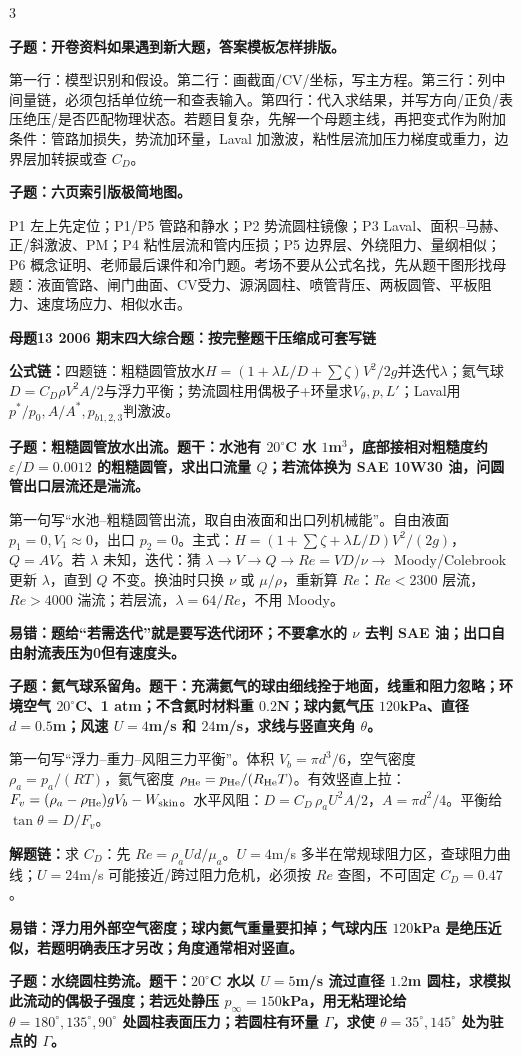 \documentclass[a4paper]{article}
\newcommand{\mt}[1]{\vspace{0.22pt}\colorbox{M}{\parbox{\dimexpr\linewidth-2\fboxsep}{\color{white}\bfseries #1}}\par}
\newcommand{\qt}[1]{\vspace{0.10pt}\colorbox{Q}{\parbox{\dimexpr\linewidth-2\fboxsep}{\color{white}\bfseries #1}}\par}
\newcommand{\ans}[1]{\colorbox{G}{\parbox{\dimexpr\linewidth-2\fboxsep}{#1}}\par}
\newcommand{\warn}[1]{\colorbox{Y}{\parbox{\dimexpr\linewidth-2\fboxsep}{\color{E}\bfseries #1}}\par}
\newcommand{\chain}[1]{{\color{A}\bfseries 解题链：}#1\par}
\newcommand{\form}[1]{{\color{M}\bfseries 公式链：}#1\par}
\begin{document}
\begin{multicols}{3}
\qt{子题：开卷资料如果遇到新大题，答案模板怎样排版。}
\ans{第一行：模型识别和假设。第二行：画截面/CV/坐标，写主方程。第三行：列中间量链，必须包括单位统一和查表输入。第四行：代入求结果，并写方向/正负/表压绝压/是否匹配物理状态。若题目复杂，先解一个母题主线，再把变式作为附加条件：管路加损失，势流加环量，Laval 加激波，粘性层流加压力梯度或重力，边界层加转捩或查 $C_D$。}
\qt{子题：六页索引版极简地图。}
\ans{P1 左上先定位；P1/P5 管路和静水；P2 势流圆柱镜像；P3 Laval、面积--马赫、正/斜激波、PM；P4 粘性层流和管内压损；P5 边界层、外绕阻力、量纲相似；P6 概念证明、老师最后课件和冷门题。考场不要从公式名找，先从题干图形找母题：液面管路、闸门曲面、CV受力、源涡圆柱、喷管背压、两板圆管、平板阻力、速度场应力、相似水击。}

\mt{母题13 2006 期末四大综合题：按完整题干压缩成可套写链}
\form{四题链：粗糙圆管放水$H=(1+\lambda L/D+\sum\zeta)V^2/2g$并迭代$\lambda$；氦气球$D=C_D\rho V^2A/2$与浮力平衡；势流圆柱用偶极子+环量求$V_\theta,p,L'$；Laval用$p^*/p_0,A/A^*,p_{b1,2,3}$判激波。}
\qt{子题：粗糙圆管放水出流。题干：水池有 $20^\circ$C 水 $1$m$^3$，底部接相对粗糙度约 $\varepsilon/D=0.0012$ 的粗糙圆管，求出口流量 $Q$；若流体换为 SAE 10W30 油，问圆管出口层流还是湍流。}
\ans{第一句写“水池--粗糙圆管出流，取自由液面和出口列机械能”。自由液面 $p_1=0,V_1\approx0$，出口 $p_2=0$。主式：$H=(1+\sum\zeta+\lambda L/D)V^2/(2g)$，$Q=AV$。若 $\lambda$ 未知，迭代：猜 $\lambda\to V\to Q\to Re=VD/\nu\to$ Moody/Colebrook 更新 $\lambda$，直到 $Q$ 不变。换油时只换 $\nu$ 或 $\mu/\rho$，重新算 $Re$：$Re<2300$ 层流，$Re>4000$ 湍流；若层流，$\lambda=64/Re$，不用 Moody。}
\warn{易错：题给“若需迭代”就是要写迭代闭环；不要拿水的 $\nu$ 去判 SAE 油；出口自由射流表压为0但有速度头。}
\qt{子题：氦气球系留角。题干：充满氦气的球由细线拴于地面，线重和阻力忽略；环境空气 $20^\circ$C、1 atm；不含氦时材料重 $0.2$N；球内氦气压 $120$kPa、直径 $d=0.5$m；风速 $U=4$m/s 和 $24$m/s，求线与竖直夹角 $\theta$。}
\ans{第一句写“浮力--重力--风阻三力平衡”。体积 $V_b=\pi d^3/6$，空气密度 $\rho_a=p_a/(RT)$，氦气密度 $\rho_{\rm He}=p_{\rm He}/(R_{\rm He}T)$。有效竖直上拉：$F_v=(\rho_a-\rho_{\rm He})gV_b-W_{\rm skin}$。水平风阻：$D=C_D\,\rho_aU^2A/2$，$A=\pi d^2/4$。平衡给 $\tan\theta=D/F_v$。}
\chain{求 $C_D$：先 $Re=\rho_aUd/\mu_a$。$U=4$m/s 多半在常规球阻力区，查球阻力曲线；$U=24$m/s 可能接近/跨过阻力危机，必须按 $Re$ 查图，不可固定 $C_D=0.47$。}
\warn{易错：浮力用外部空气密度；球内氦气重量要扣掉；气球内压 $120$kPa 是绝压近似，若题明确表压才另改；角度通常相对竖直。}
\qt{子题：水绕圆柱势流。题干：$20^\circ$C 水以 $U=5$m/s 流过直径 $1.2$m 圆柱，求模拟此流动的偶极子强度；若远处静压 $p_\infty=150$kPa，用无粘理论给 $\theta=180^\circ,135^\circ,90^\circ$ 处圆柱表面压力；若圆柱有环量 $\Gamma$，求使 $\theta=35^\circ,145^\circ$ 处为驻点的 $\Gamma$。}

\end{multicols}
\end{document}
